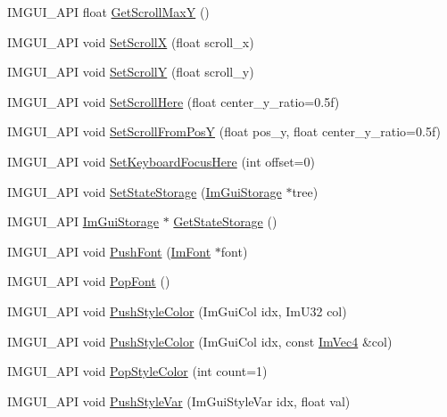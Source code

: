\begin{DoxyCompactItemize}
\item 
I\+M\+G\+U\+I\+\_\+\+A\+PI float \hyperlink{namespace_im_gui_ab34c0d5c63908a7ff50923151730f76a}{Get\+Scroll\+MaxY} ()
\item 
I\+M\+G\+U\+I\+\_\+\+A\+PI void \hyperlink{namespace_im_gui_a0796750de8c50555d895f63e79ac87f0}{Set\+ScrollX} (float scroll\+\_\+x)
\item 
I\+M\+G\+U\+I\+\_\+\+A\+PI void \hyperlink{namespace_im_gui_a41833555962807384432e6fc94d46ec9}{Set\+ScrollY} (float scroll\+\_\+y)
\item 
I\+M\+G\+U\+I\+\_\+\+A\+PI void \hyperlink{namespace_im_gui_aa60ea4a42b8d03d27431f8e79b9f0254}{Set\+Scroll\+Here} (float center\+\_\+y\+\_\+ratio=0.\+5f)
\item 
I\+M\+G\+U\+I\+\_\+\+A\+PI void \hyperlink{namespace_im_gui_a57d8e9497ad39584ba740cef70b78fb4}{Set\+Scroll\+From\+PosY} (float pos\+\_\+y, float center\+\_\+y\+\_\+ratio=0.\+5f)
\item 
I\+M\+G\+U\+I\+\_\+\+A\+PI void \hyperlink{namespace_im_gui_ae85e5fba7e88cea8bd3ba5b687c979f2}{Set\+Keyboard\+Focus\+Here} (int offset=0)
\item 
I\+M\+G\+U\+I\+\_\+\+A\+PI void \hyperlink{namespace_im_gui_a635f4511603cc6284d8b21fb8d53090d}{Set\+State\+Storage} (\hyperlink{struct_im_gui_storage}{Im\+Gui\+Storage} $\ast$tree)
\item 
I\+M\+G\+U\+I\+\_\+\+A\+PI \hyperlink{struct_im_gui_storage}{Im\+Gui\+Storage} $\ast$ \hyperlink{namespace_im_gui_aa2b8fa1a5320cd70f23a53d8fe604fb2}{Get\+State\+Storage} ()
\item 
I\+M\+G\+U\+I\+\_\+\+A\+PI void \hyperlink{namespace_im_gui_ac5a59f4f8226fd35786d8973c85b85a9}{Push\+Font} (\hyperlink{struct_im_font}{Im\+Font} $\ast$font)
\item 
I\+M\+G\+U\+I\+\_\+\+A\+PI void \hyperlink{namespace_im_gui_af66649bc37022bf3cf2496c73af9a499}{Pop\+Font} ()
\item 
I\+M\+G\+U\+I\+\_\+\+A\+PI void \hyperlink{namespace_im_gui_a77ee84afb636e05eb4b2d6eeddcc2aa8}{Push\+Style\+Color} (Im\+Gui\+Col idx, Im\+U32 col)
\item 
I\+M\+G\+U\+I\+\_\+\+A\+PI void \hyperlink{namespace_im_gui_a5bd052ebf55015312a53739974950e7b}{Push\+Style\+Color} (Im\+Gui\+Col idx, const \hyperlink{struct_im_vec4}{Im\+Vec4} \&col)
\item 
I\+M\+G\+U\+I\+\_\+\+A\+PI void \hyperlink{namespace_im_gui_a9795f730b4043a98b6254738d86efcdc}{Pop\+Style\+Color} (int count=1)
\item 
I\+M\+G\+U\+I\+\_\+\+A\+PI void \hyperlink{namespace_im_gui_aab3f43009094462cf2a5eb554785949b}{Push\+Style\+Var} (Im\+Gui\+Style\+Var idx, float val)

\end{DoxyCompactItemize}
